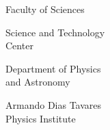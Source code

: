 
\begin{titlepage}
\pagestyle{empty}
\setlength{\topmargin}{0cm}

\large

\begin{figure}
\hspace{2.2cm}
\hspace{4.4cm}
\end{figure}


\begin{minipage}[t]{0.45\textwidth}
\begin{center}
Faculty of Sciences \\
\end{center}
\end{minipage}
\begin{minipage}[t]{0.5\textwidth}  
\begin{center}
Science and Technology\\ Center \\
\end{center}
\end{minipage} 

\vspace{0.5cm}

\begin{minipage}[t]{0.45\textwidth}
\begin{center}
Department of Physics \\and Astronomy 
\end{center}
\end{minipage}
\begin{minipage}[t]{0.5\textwidth}  
\begin{center}
Armando Dias Tavares \\Physics Institute
\end{center}
\end{minipage}






\end{titlepage}
